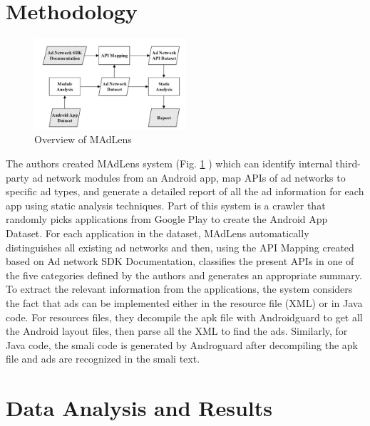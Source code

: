 \documentclass[conference]{IEEEtran}
\begin{document}
\section{Methodology}
\begin{figure}[htbp]
	\includegraphics[width=0.5\textwidth,height=0.5\textheight,keepaspectratio]{system.png}
	\caption{Overview of MAdLens}
	\label{fig:system}
\end{figure}
The authors created MAdLens system (Fig. \ref{fig:system} ) which can identify internal third-party ad network modules from an Android app, map APIs of ad networks to specific ad types, and generate a detailed report of all the ad information for each app using static analysis techniques. Part of this system is a crawler that randomly picks applications from Google Play to create the Android App Dataset. For each application in the dataset, MAdLens automatically distinguishes all existing ad networks and then, using the API Mapping created based on Ad network SDK Documentation, classifies the present APIs in one of the five categories defined by the authors and generates an appropriate summary. To extract the relevant information from the applications, the system considers the fact that ads can be implemented either in the resource file (XML) or in Java code. For resources files, they decompile the apk file with Androidguard to get all the Android layout files, then parse all the XML to find the ads. Similarly, for Java code, the smali code is generated by Androguard after decompiling the apk file and ads are recognized in the smali text.

\section{Data Analysis and Results}
\end{document}
